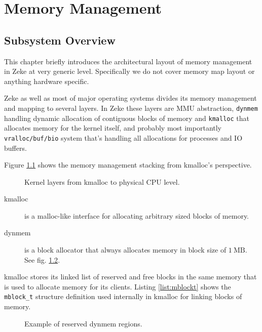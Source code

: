 \part{Memory Management}

\chapter{Subsystem Overview}

This chapter briefly introduces the architectural layout of memory management
in Zeke at very generic level. Specifically we do not cover memory map layout or
anything hardware specific.

Zeke as well as most of major operating systems divides its memory management
and mapping to several layers. In Zeke these layers are \ac{MMU} abstraction,
\verb+dynmem+ handling dynamic allocation of contiguous blocks of memory and
\verb+kmalloc+ that allocates memory for the kernel itself, and probably most
importantly \verb+vralloc/buf/bio+ system that's handling all allocations for
processes and IO buffers.

Figure \ref{figure:mm_layers} shows the memory management stacking from kmalloc's
perspective.

\begin{figure}
  
  \centering
  \caption{Kernel layers from kmalloc to physical \acs{CPU} level.}
  \label{figure:mm_layers}
\end{figure}

\begin{description}
\item[kmalloc] is a malloc-like interface for allocating arbitrary sized blocks
  of memory.
\item[dynmem] is a block allocator that always allocates memory in block size of
  $1 \:\textrm{MB}$. See fig. \ref{figure:dynmem_blocks}.
\end{description}

kmalloc stores its linked list of reserved and free blocks in the same memory
that is used to allocate memory for its clients. Listing \ref{list:mblockt}
shows the \verb+mblock_t+ structure definition used internally in kmalloc for
linking blocks of memory.

\begin{figure}
  
  \centering
  \caption{Example of reserved dynmem regions.}
  \label{figure:dynmem_blocks}
\end{figure}







